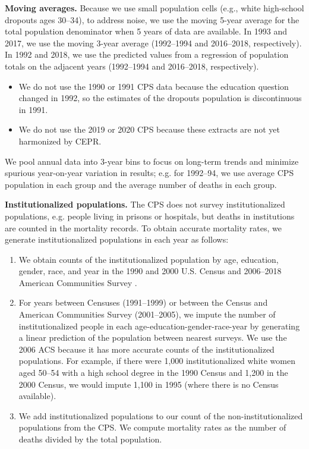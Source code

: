 \textbf{Moving averages.} Because we use
small population cells (e.g., white high-school dropouts ages 30--34),
to address noise, we use the moving 5-year average for the total population
denominator when 5 years of data are available. In 1993 and 2017, we
use the moving 3-year average (1992--1994 and 2016--2018,
respectively). In 1992 and 2018, we use the predicted values from a
regression of population totals on the adjacent years (1992--1994 and
2016--2018, respectively). 
\begin{itemize}
\item We do not use the 1990 or 1991 CPS data because
the education question changed in 1992, so the estimates of the
dropouts population is discontinuous in 1991. 
\item We do not use the 2019 or 2020 CPS because these extracts are
  not yet harmonized by CEPR. 
\end{itemize} 
We pool annual data into 3-year bins to focus on long-term trends and minimize spurious year-on-year variation in results; e.g. for 1992--94, we use average CPS population in each group and the average number of deaths in each group.

\textbf{Institutionalized populations.} The CPS does not survey
institutionalized populations, e.g. people living in prisons or
hospitals, but deaths in institutions are counted in the mortality
records. To obtain accurate mortality rates, we generate
institutionalized populations in each year as follows:
\begin{enumerate} 
\item We obtain counts of the institutionalized population by age,
  education, gender, race, and year in the 1990 and 2000 
  U.S. Census \citep{ipums} and 2006--2018 American Communities Survey \citep{acs}.
\item For years between Censuses (1991--1999) or between the Census
  and American Communities Survey (2001--2005), we impute the
  number of institutionalized people in each
  age-education-gender-race-year by generating a linear prediction of the
  population between nearest surveys. We use the 2006 ACS because it
  has more accurate counts of the institutionalized populations. For example, if there were 1,000
  institutionalized white women aged 50--54 with a high school degree in
  the 1990 Census and 1,200 in the 2000 Census, we would impute 1,100 in
  1995 (where there is no Census available). 
\item We add institutionalized populations to our count of the
  non-institutionalized populations from the CPS. We compute mortality
  rates as the number of deaths divided by the total population. 
\end{enumerate}

